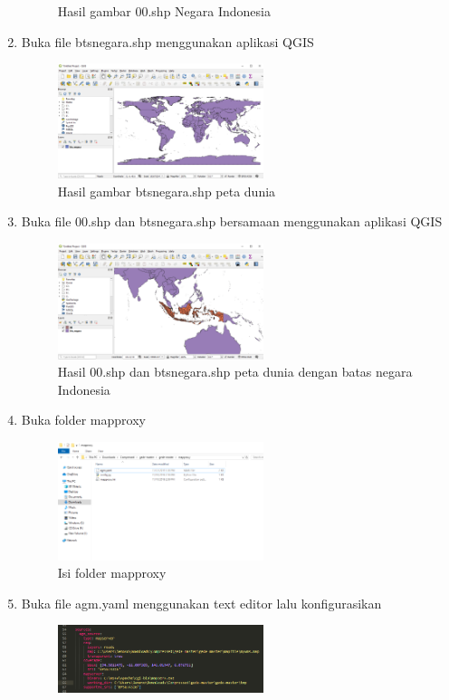 \begin{enumerate}
\begin{figure}[H]
			\centering
			\caption{Hasil gambar 00.shp Negara Indonesia}
		\end{figure}
	\item Buka file btsnegara.shp menggunakan aplikasi QGIS
		\begin{figure}[H]
			\includegraphics[width=6cm]{figures/Tugas4/1174071/9.png}
			\centering
			\caption{Hasil gambar btsnegara.shp peta dunia}
		\end{figure}
	\item Buka file 00.shp dan btsnegara.shp bersamaan menggunakan aplikasi QGIS
		\begin{figure}[H]
			\includegraphics[width=6cm]{figures/Tugas4/1174071/10.png}
			\centering
			\caption{Hasil 00.shp dan btsnegara.shp peta dunia dengan batas negara Indonesia}
		\end{figure}
	\item Buka folder mapproxy
		\begin{figure}[H]
			\includegraphics[width=6cm]{figures/Tugas4/1174071/11.png}
			\centering
			\caption{Isi folder mapproxy}
		\end{figure}
	\item Buka file agm.yaml menggunakan text editor lalu konfigurasikan
		\begin{figure}[H]
			\includegraphics[width=6cm]{figures/Tugas4/1174071/12.png}

\end{figure}
\end{enumerate}
